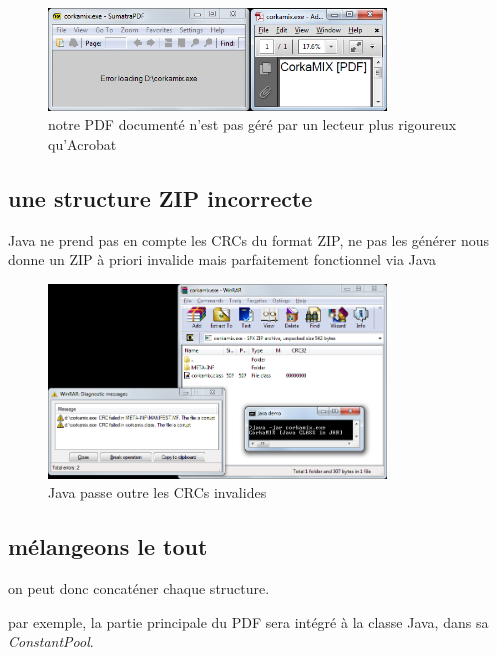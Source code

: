 \begin{lstlisting}[language={},caption={un PDF valide de 36 octets},label={lst:albertini:tinypdf}]
%PDF- trailer<</Root<</Pages<<>>>>>>
\end{lstlisting}

\begin{figure}[ht]
  \centering
  \includegraphics[width=0.8\textwidth]{albertini/img/undocumentedPDF}
  \caption{notre PDF documenté n'est pas géré par un lecteur plus rigoureux qu'Acrobat}
  \label{fig:albertini:undocumentedPDF}
\end{figure}


\subsection{une structure ZIP incorrecte}

Java ne prend pas en compte les CRCs du format ZIP, ne pas les générer nous donne un ZIP à priori invalide mais parfaitement fonctionnel via Java
\begin{figure}[ht]
  \centering
  \includegraphics[width=0.8\textwidth]{albertini/img/wrong_crcs}
  \caption{Java passe outre les CRCs invalides}
  \label{fig:albertini:wrong_crcs}
\end{figure}

\subsection{mélangeons le tout}
on peut donc concaténer chaque structure.

par exemple, la partie principale du PDF sera intégré à la classe Java, dans sa {\em ConstantPool}.

